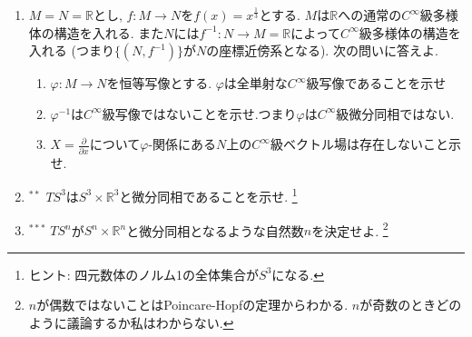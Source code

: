 \documentclass[dvipdfmx,a4paper,11pt]{article}
\newcommand{\R}{\mathbb{R}}
\theoremstyle{definition}
\newcommand{\pdrv}[2]{\frac{\partial #1}{\partial #2}}
\begin{document}
\begin{enumerate}[label=\textbf{問}2.\arabic*]
\item  $M=N=\R$とし, $f : M \rightarrow N$を$f(x) = x^{\frac{1}{3}}$とする. 
$M$は$\R$への通常の$C^{\infty}$級多様体の構造を入れる. 
また$N$には$f^{-1} : N \rightarrow M = \R$によって$C^{\infty}$級多様体の構造を入れる
(つまり$\{ (N,f^{-1}) \}$が$N$の座標近傍系となる).
次の問いに答えよ.
\begin{enumerate}
\item $\varphi : M \rightarrow N$を恒等写像とする. $\varphi$は全単射な$C^{\infty}$級写像であることを示せ%
\item $\varphi^{-1}$は$C^{\infty}$級写像ではないことを示せ.つまり$\varphi$は$C^{\infty}$級微分同相ではない. 
\item $X = \pdrv{}{x}$について$\varphi$-関係にある$N$上の$C^{\infty}$級ベクトル場は存在しないこと示せ. 
\end{enumerate}


\item $^{**}$ $TS^3 $は$S^3 \times \R^{3}$と微分同相であることを示せ. \footnote{ヒント: 四元数体のノルム1の全体集合が$S^{3}$になる.}
\item$^{***} $ $TS^n$が$S^n \times \R^{n}$と微分同相となるような自然数$n$を決定せよ. \footnote{$n$が偶数ではないことはPoincare-Hopfの定理からわかる. $n$が奇数のときどのように議論するか私はわからない.}


\end{enumerate}
\end{document}
